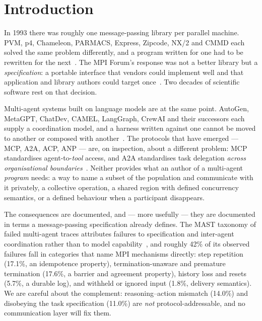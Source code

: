 \documentclass[10pt,twocolumn]{article}
\theoremstyle{definition}
\theoremstyle{plain}
\begin{document}
\section{Introduction}
\label{sec:intro}

In 1993 there was roughly one message-passing library per parallel machine. PVM,
p4, Chameleon, PARMACS, Express, Zipcode, NX/2 and CMMD each solved the same
problem differently, and a program written for one had to be rewritten for the
next~\cite{walker92,geist94-pvm,butler94-p4,calkin94-parmacs,express92,skjellum90}.
The MPI Forum's response was not a better library but a \emph{specification}: a
portable interface that vendors could implement well and that application and
library authors could target once~\cite{mpiforum94,dongarra96}. Two decades of
scientific software rest on that decision.

Multi-agent systems built on language models are at the same point.
AutoGen, MetaGPT, ChatDev, CAMEL, LangGraph, CrewAI and their successors each
supply a coordination model, and a harness written against one cannot be moved to
another or composed with
another~\cite{wu24autogen,hong24metagpt,qian24chatdev,li23camel,langgraph,crewai}.
The protocols that have emerged --- MCP, A2A, ACP, ANP --- are, on inspection,
about a different problem: MCP standardises agent-to-\emph{tool} access, and A2A
standardises task delegation \emph{across organisational
boundaries}~\cite{mcpspec2026,a2adefs,anpwp,coral}. Neither provides what an
author of a multi-agent \emph{program} needs: a way to name a subset of the
population and communicate with it privately, a collective operation, a shared
region with defined concurrency semantics, or a defined behaviour when a
participant disappears.

The consequences are documented, and --- more usefully --- they are documented in
terms a message-passing specification already defines. The MAST taxonomy of failed
multi-agent traces attributes failures to specification and inter-agent
coordination rather than to model capability~\cite{mast,mastneurips}, and roughly
42\% of its observed failures fall in categories that name MPI mechanisms directly:
step repetition (17.1\%, an idempotence property), termination-unaware and
premature termination (17.6\%, a barrier and agreement property), history loss and
resets (5.7\%, a durable log), and withheld or ignored input (1.8\%, delivery
semantics). We are careful about the complement: reasoning--action mismatch (14.0\%)
and disobeying the task specification (11.0\%) are \emph{not} protocol-addressable,
and no communication layer will fix them.
\end{document}
